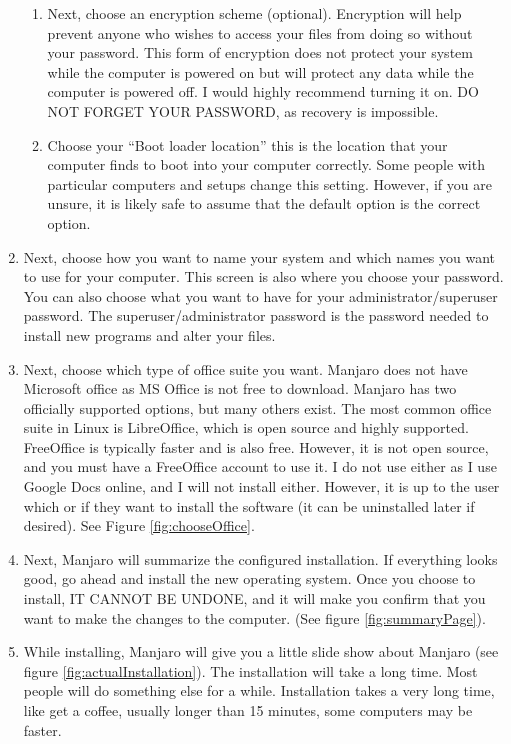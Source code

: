 \documentclass{article}
\begin{document}
\begin{enumerate}
\begin{enumerate}
        \item\label{encrypt} Next, choose an encryption scheme (optional). Encryption will help prevent anyone who wishes to access your files from doing so without your password. This form of encryption does not protect your system while the computer is powered on but will protect any data while the computer is powered off. I would highly recommend turning it on. DO NOT FORGET YOUR PASSWORD, as recovery is impossible.
        \item Choose your ``Boot loader location'' this is the location that your computer finds to boot into your computer correctly. Some people with particular computers and setups change this setting. However, if you are unsure, it is likely safe to assume that the default option is the correct option.
    \end{enumerate}
    \item Next, choose how you want to name your system and which names you want to use for your computer. This screen is also where you choose your password. You can also choose what you want to have for your administrator/superuser password. The superuser/administrator password is the password needed to install new programs and alter your files. 
    \item Next, choose which type of office suite you want. Manjaro does not have Microsoft office as MS Office is not free to download. Manjaro has two officially supported options, but many others exist. The most common office suite in Linux is LibreOffice, which is open source and highly supported. FreeOffice is typically faster and is also free. However, it is not open source, and you must have a FreeOffice account to use it. I do not use either as I use Google Docs online, and I will not install either. However, it is up to the user which or if they want to install the software (it can be uninstalled later if desired). See Figure \ref{fig:chooseOffice}.
    \item Next, Manjaro will summarize the configured installation. If everything looks good, go ahead and install the new operating system. Once you choose to install, IT CANNOT BE UNDONE, and it will make you confirm that you want to make the changes to the computer. (See figure \ref{fig:summaryPage}).
    \item While installing, Manjaro will give you a little slide show about Manjaro (see figure \ref{fig:actualInstallation}). The installation will take a long time. Most people will do something else for a while. Installation takes a very long time, like get a coffee, usually longer than 15 minutes, some computers may be faster.

\end{enumerate}
\end{document}
